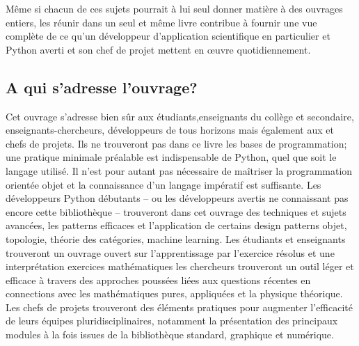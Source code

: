 Même si chacun de ces sujets pourrait à lui seul donner matière à des ouvrages entiers, les réunir dans 
un seul et même livre contribue à fournir une vue complète de ce qu’un développeur d'application 
scientifique en particulier et Python averti et son chef de projet mettent en œuvre quotidiennement.

\subsection*{A qui s'adresse l'ouvrage?}
Cet ouvrage s’adresse bien sûr aux étudiants,enseignants du 
collège et secondaire, enseignants-chercheurs, développeurs 
de tous horizons mais également aux et chefs de projets. 
Ils ne trouveront pas dans ce livre les bases de 
programmation; une pratique minimale préalable est 
indispensable de Python, quel que soit le langage 
utilisé. Il n'est pour autant pas nécessaire de maîtriser 
la programmation orientée objet et la connaissance d'un 
langage impératif est suffisante.
Les développeurs Python débutants – ou les développeurs avertis ne connaissant pas
encore cette bibliothèque – trouveront dans cet ouvrage des techniques et sujets avancées, les patterns 
efficaces et l'application de certains design patterns objet, topologie, théorie des catégories, machine
learning.
Les étudiants et enseignants trouveront un ouvrage ouvert sur l'apprentissage par l'exercice résolus et 
une interprétation exercices mathématiques  
les chercheurs trouveront un outil léger et efficace à travers des approches poussées liées aux 
questions récentes en connections avec les mathématiques pures, appliquées et la physique théorique.
Les chefs de projets trouveront des éléments pratiques pour augmenter l’efficacité de
leurs équipes pluridisciplinaires, notamment la présentation des principaux modules à la fois issues de la bibliothèque standard, graphique et numérique.
